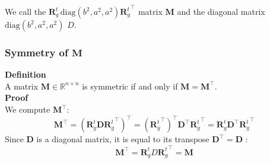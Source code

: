 We call the \( \mathbf{R}_g^t \, \text{diag}(b^2, a^2, a^2) {\mathbf{R}_g^t}^\top \) matrix $\mathbf{M}$ and the diagonal matrix $\text{diag}(b^2, a^2, a^2)$ $D$.

\subsubsection{Symmetry of \( \mathbf{M} \)}
\textbf{Definition} \\
A matrix \( \mathbf{M} \in \mathbb{R}^{n \times n} \) is symmetric if and only if \( \mathbf{M} = \mathbf{M}^\top \).
\\
\textbf{Proof} \\
We compute \( \mathbf{M}^\top \):
\[
    \mathbf{M}^\top = \left( \mathbf{R}_g^t \mathbf{D} {\mathbf{R}_g^t}^\top \right)^\top = \left( {\mathbf{R}_g^t}^\top \right)^\top \mathbf{D}^\top {\mathbf{R}_g^t}^\top = \mathbf{R}_g^t \mathbf{D}^\top {\mathbf{R}_g^t}^\top
\]
Since \( \mathbf{D} \) is a diagonal matrix, it is equal to its transpose $\mathbf{D}^\top = \mathbf{D}$ :
$$
\mathbf{M}^\top =  \mathbf{R}_g^t D {\mathbf{R}_g^t}^\top = \mathbf{M}
$$

